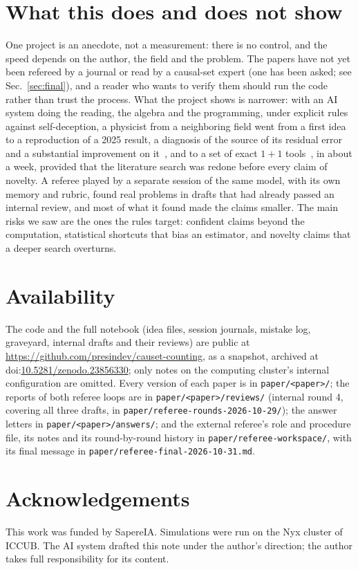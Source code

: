 \documentclass[11pt,a4paper]{article}
\begin{document}
\section{What this does and does not show}
One project is an anecdote, not a measurement: there is no control, and the speed depends on the author, the field and the problem. The papers have not yet been refereed by a journal or read by a causal-set expert (one has been asked; see Sec.~\ref{sec:final}), and a reader who wants to verify them should run the code rather than trust the process. What the project shows is narrower: with an AI system doing the reading, the algebra and the programming, under explicit rules against self-deception, a physicist from a neighboring field went from a first idea to a reproduction of a 2025 result, a diagnosis of the source of its residual error and a substantial improvement on it~\cite{Embedding}, and to a set of exact $1+1$ tools~\cite{Toolkit}, in about a week, provided that the literature search was redone before every claim of novelty. A referee played by a separate session of the same model, with its own memory and rubric, found real problems in drafts that had already passed an internal review, and most of what it found made the claims smaller. The main risks we saw are the ones the rules target: confident claims beyond the computation, statistical shortcuts that bias an estimator, and novelty claims that a deeper search overturns.

\section*{Availability}
The code and the full notebook (idea files, session journals, mistake log, graveyard, internal drafts and their reviews) are public at \url{https://github.com/presindev/causet-counting}, as a snapshot, archived at doi:\href{https://doi.org/10.5281/zenodo.23856330}{10.5281/zenodo.23856330}; only notes on the computing cluster's internal configuration are omitted. Every version of each paper is in \nolinkurl{paper/<paper>/}; the reports of both referee loops are in \nolinkurl{paper/<paper>/reviews/} (internal round 4, covering all three drafts, in \nolinkurl{paper/referee-rounds-2026-10-29/}); the answer letters in \nolinkurl{paper/<paper>/answers/}; and the external referee's role and procedure file, its notes and its round-by-round history in \nolinkurl{paper/referee-workspace/}, with its final message in \nolinkurl{paper/referee-final-2026-10-31.md}.

\section*{Acknowledgements}
This work was funded by SapereIA. Simulations were run on the Nyx cluster of ICCUB. The AI system drafted this note under the author's direction; the author takes full responsibility for its content.
\end{document}
